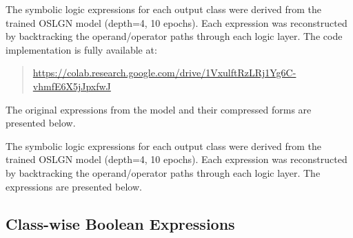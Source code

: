 \label{appendix:symbolic}

The symbolic logic expressions for each output class were derived from the trained OSLGN model (depth=4, 10 epochs). Each expression was reconstructed by backtracking the operand/operator paths through each logic layer. The code implementation is fully available at:

\begin{quote}
\url{https://colab.research.google.com/drive/1VxulftRzLRj1Yg6C-vhmfE6X5jJpxfwJ}
\end{quote}

The original expressions from the model and their compressed forms are presented below.

The symbolic logic expressions for each output class were derived from the trained OSLGN model (depth=4, 10 epochs). Each expression was reconstructed by backtracking the operand/operator paths through each logic layer. The expressions are presented below.

\subsection{Class-wise Boolean Expressions}

